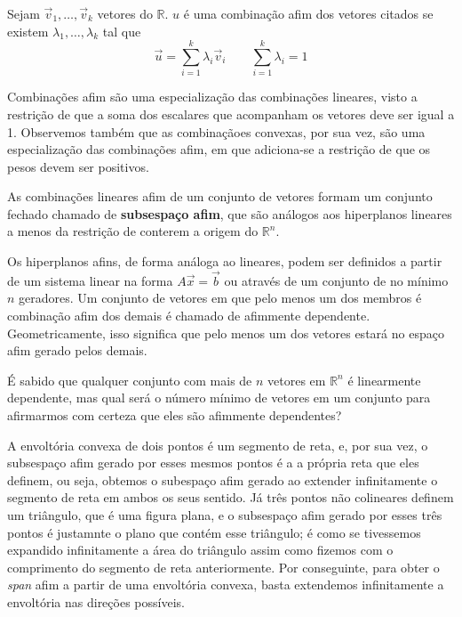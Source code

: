 \begin{def:combinação afim}
Sejam $\vec v_1, \ldots, \vec v_k$ vetores do $\mathbb{R}$. $u$ é uma
combinação afim dos vetores citados  se existem $\lambda_1, \ldots,
\lambda_k$ tal que
\begin{equation*}
	\vec u = \sum_{i =1}^{k}\lambda_i \vec v_i \quad \quad \sum_{i=1}^{k} \lambda_i = 1
\end{equation*}
\end{def:combinação afim}
Combinações afim são uma especialização das combinações
lineares, visto a restrição de que a soma dos escalares
que acompanham os vetores deve ser igual a 1. Observemos
também que as combinaçãoes convexas, por sua vez, são uma
especialização das combinações afim, em que adiciona-se a
restrição de que os pesos devem ser positivos.

As combinações lineares afim de um conjunto de vetores
formam um conjunto fechado chamado de \textbf{subsespaço afim},
que são análogos aos hiperplanos lineares a menos
da restrição de conterem a
origem do $\mathbb{R}^n$.


Os hiperplanos  afins, de forma análoga ao lineares, podem ser
definidos a partir de um sistema linear na forma $A\vec x = \vec b$
ou através de um conjunto de no mínimo $n$ geradores.
Um conjunto de vetores em que pelo menos um dos membros
é combinação afim dos demais é chamado de afimmente dependente.
Geometricamente, isso significa que pelo menos um dos vetores estará
no espaço afim gerado pelos demais.

É sabido que qualquer conjunto com mais de $n$ vetores em
$\mathbb{R}^n$ é linearmente dependente, mas qual será o número mínimo
de vetores em um conjunto para afirmarmos com certeza que eles são
afimmente dependentes?

A envoltória convexa de dois pontos é um segmento de reta, e,
por sua vez, o subsespaço afim gerado por esses mesmos pontos é a
a própria reta que eles definem, ou seja, obtemos o subespaço
afim gerado ao extender infinitamente o segmento de reta em
ambos os seus sentido. Já três pontos não colineares
definem um triângulo, que é uma figura plana, e o subsespaço afim gerado por
esses três pontos é justamnte o plano que contém esse triângulo; é como se
tivessemos expandido infinitamente a área do triângulo assim como fizemos
com o comprimento do segmento de reta anteriormente. Por conseguinte,
para obter o \textit{span} afim a partir de uma envoltória convexa, basta
extendemos infinitamente a envoltória nas direções possíveis.

